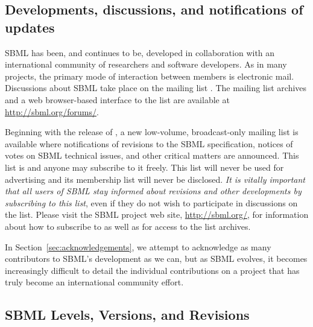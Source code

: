 \subsection{Developments, discussions, and notifications of updates}


SBML has been, and continues to be, developed in collaboration
with an international community of researchers and software
developers.  As in many projects, the primary mode of interaction
between members is electronic mail.  Discussions about SBML take
place on the mailing list
.  The
mailing list archives and a web browser-based interface to the
list are available at \url{http://sbml.org/forums/}.

Beginning with the release of \sbmltwotwo, a new low-volume,
broadcast-only mailing list is available where notifications of
revisions to the SBML specification, notices of votes on SBML
technical issues, and other critical matters are announced.  This
list is 
and anyone may subscribe to it freely.  This list will never be
used for advertising and its membership list will never be
disclosed.  \emph{It is vitally important that all users of SBML
  stay informed about revisions and other developments by
  subscribing to this list}, even if they do not wish to
participate in discussions on the
 list.
Please visit the SBML project web site, \url{http://sbml.org/},
for information about how to subscribe to
 as well
as for access to the list archives.

In Section~\ref{sec:acknowledgements}, we attempt to acknowledge
as many contributors to SBML's development as we can, but as SBML
evolves, it becomes increasingly difficult to detail the
individual contributions on a project that has truly become an
international community effort.


\subsection{SBML Levels, Versions, and Revisions}
\label{sec:levels-versions-revisions}

